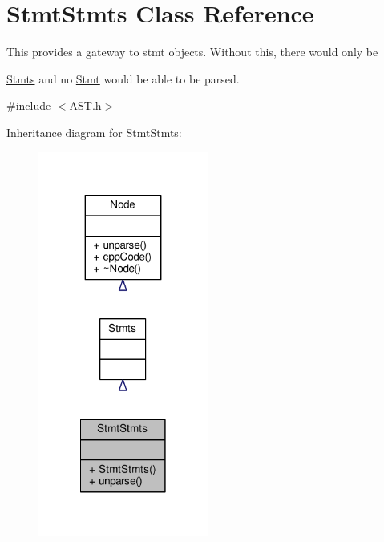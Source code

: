 \hypertarget{classStmtStmts}{\section{Stmt\-Stmts Class Reference}
\label{classStmtStmts}
}


This provides a gateway to stmt objects. Without this, there would only be \par
 \hyperlink{classStmts}{Stmts} and no \hyperlink{classStmt}{Stmt} would be able to be parsed.  




{\ttfamily \#include $<$A\-S\-T.\-h$>$}



Inheritance diagram for Stmt\-Stmts\-:\nopagebreak
\begin{figure}[H]
\begin{center}
\leavevmode
\includegraphics[width=158pt]{classStmtStmts__inherit__graph}
\end{center}
\end{figure}


